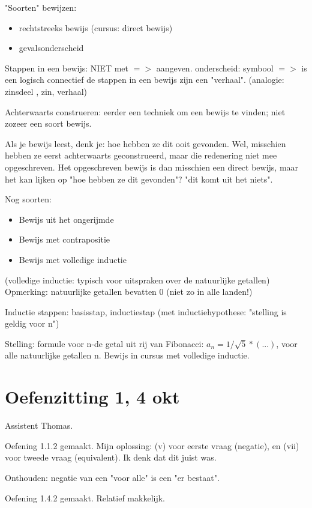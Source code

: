 \documentclass{article}
\begin{document}
"Soorten" bewijzen: 
\begin{itemize}
    \item rechtstreeks bewijs (cursus: direct bewijs) 
    \item gevalsonderscheid
\end{itemize}


Stappen in een bewijs: NIET met $=>$ aangeven. 
onderscheid: 
symbool $=>$ is een logisch connectief 
de stappen in een bewijs zijn een "verhaal". 
(analogie: zinsdeel , zin, verhaal) 

Achterwaarts construeren: 
eerder een techniek om een bewijs te vinden; niet zozeer een soort bewijs. 

Als je bewijs leest, denk je: hoe hebben ze dit ooit gevonden. Wel, misschien hebben ze eerst achterwaarts geconstrueerd, maar die redenering niet mee opgeschreven. Het opgeschreven bewijs is dan misschien een direct bewijs, maar het kan lijken op "hoe hebben ze dit gevonden"? "dit komt uit het niets". 

Nog soorten: 
\begin{itemize}
    \item Bewijs uit het ongerijmde 
\item Bewijs met contrapositie
\item Bewijs met volledige inductie
\end{itemize}

(volledige inductie: typisch voor uitspraken over de natuurlijke getallen)
Opmerking: natuurlijke getallen bevatten 0 (niet zo in alle landen!) 

Inductie stappen: basisstap, inductiestap (met inductiehypothese: "stelling is geldig voor n")

Stelling: formule voor n-de getal uit rij van Fibonacci: $a_n = 1/\sqrt{5} * (...) $, voor alle natuurlijke getallen n. 
Bewijs in cursus met volledige inductie. 



\section{Oefenzitting 1, 4 okt}

Assistent Thomas. 

Oefening 1.1.2 gemaakt. Mijn oplossing: (v) voor eerste vraag (negatie), en (vii) voor tweede vraag (equivalent). Ik denk dat dit juist was. 

Onthouden: negatie van een "voor alle" is een "er bestaat". 

Oefening 1.4.2 gemaakt. Relatief makkelijk. 
\end{document}
